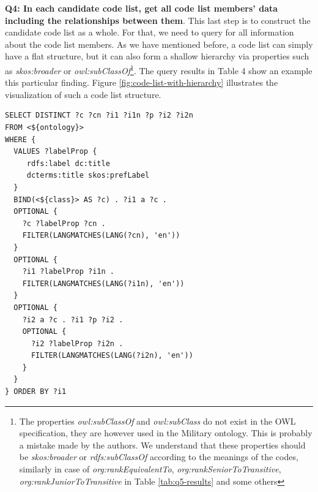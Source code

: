 \medskip
\noindent\textbf{Q4: In each candidate code list, get all code list members' data including the relationships between them}. This last step is to construct the candidate code list as a whole. For that, we need to query for all information about the code list members. As we have mentioned before, a code list can simply have a flat structure, but it can also form a shallow hierarchy via properties such as \textit{skos:broader} or \textit{owl:subClassOf}\footnote{\label{note:owlSubClass}The properties \textit{owl:subClassOf} and \textit{owl:subClass} do not exist in the OWL specification, they are however used in the Military ontology. This is probably a mistake made by the authors. We understand that these properties should be \textit{skos:broader} or \textit{rdfs:subClassOf} according to the meanings of the codes, similarly in case of \textit{org:rankEquivalentTo}, \textit{org:rankSeniorToTransitive}, \textit{org:rankJuniorToTransitive} in Table \ref{tab:q5-results} and some others}. The query results in Table 4 show an example this particular finding. Figure \ref{fig:code-list-with-hierarchy} illustrates the visualization of such a code list structure.


\begin{lstlisting}[captionpos=b, caption=Q4 -- Query to get candidate code list structure,label=lst:sparql4,basicstyle=\ttfamily,frame=single]
SELECT DISTINCT ?c ?cn ?i1 ?i1n ?p ?i2 ?i2n
FROM <${ontology}> 
WHERE {
  VALUES ?labelProp { 
     rdfs:label dc:title
     dcterms:title skos:prefLabel
  }
  BIND(<${class}> AS ?c) . ?i1 a ?c .
  OPTIONAL { 
    ?c ?labelProp ?cn . 
    FILTER(LANGMATCHES(LANG(?cn), 'en')) 
  }
  OPTIONAL { 
    ?i1 ?labelProp ?i1n . 
    FILTER(LANGMATCHES(LANG(?i1n), 'en'))
  }
  OPTIONAL {
    ?i2 a ?c . ?i1 ?p ?i2 .
    OPTIONAL { 
      ?i2 ?labelProp ?i2n . 
      FILTER(LANGMATCHES(LANG(?i2n), 'en')) 
    }
  }
} ORDER BY ?i1
\end{lstlisting}


